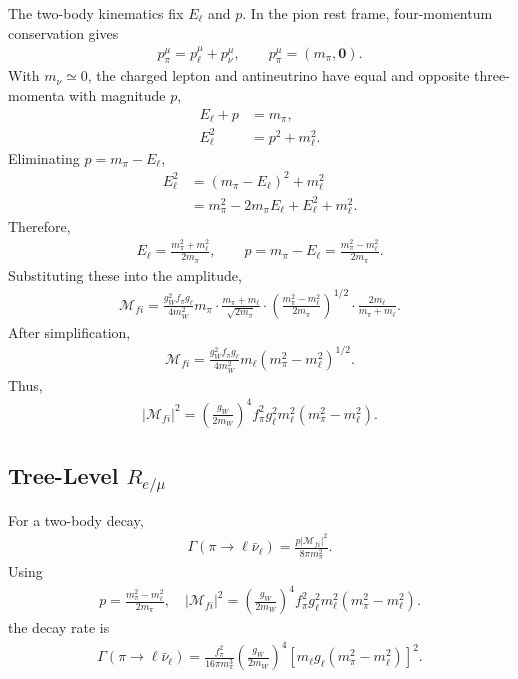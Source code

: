 The two-body kinematics fix \(E_\ell\) and \(p\). In the pion rest frame,
four-momentum conservation gives
\begin{align}
p_\pi^\mu
=
p_\ell^\mu+p_\nu^\mu,
\qquad
p_\pi^\mu = (m_\pi,\mathbf{0}).
\end{align}
With \(m_\nu \simeq 0\), the charged lepton and antineutrino have equal and
opposite three-momenta with magnitude \(p\),
\begin{align}
E_\ell + p &= m_\pi, \\
E_\ell^2 &= p^2 + m_\ell^2 .
\end{align}
Eliminating \(p=m_\pi-E_\ell\),
\begin{align}
E_\ell^2
&=
(m_\pi-E_\ell)^2+m_\ell^2 \\
&=
m_\pi^2-2m_\pi E_\ell+E_\ell^2+m_\ell^2 .
\end{align}
Therefore,
\begin{align}
E_\ell
=
\frac{m_\pi^2+m_\ell^2}{2m_\pi},
 \qquad
p
=
m_\pi-E_\ell
=
\frac{m_\pi^2-m_\ell^2}{2m_\pi}.
\end{align}
Substituting these into the amplitude,
\begin{align}
\mathcal{M}_{fi}
=
\frac{g_W^2 f_\pi g_\ell}{4m_W^2}
m_\pi
\cdot
\frac{m_\pi+m_\ell}{\sqrt{2m_\pi}}
\cdot
\left(
\frac{m_\pi^2-m_\ell^2}{2m_\pi}
\right)^{1/2}
\cdot
\frac{2m_\ell}{m_\pi+m_\ell}.
\end{align}
After simplification,
\begin{align}
\mathcal{M}_{fi}
=
\frac{g_W^2 f_\pi g_\ell}{4m_W^2}
m_\ell
\left(m_\pi^2-m_\ell^2\right)^{1/2}.
\end{align}
Thus,
\begin{align}
|\mathcal{M}_{fi}|^2
=
\left(
\frac{g_W}{2m_W}
\right)^4
f_\pi^2 g_\ell^2
m_\ell^2
\left(m_\pi^2-m_\ell^2\right).
\end{align}

\subsection{\texorpdfstring{Tree-Level $R_{e/\mu}$}{Tree-Level Re/mu}}
\label{subsec:tree-level-remu-appendix}

For a two-body decay,
\begin{align}
\Gamma(\pi \to \ell \bar{\nu}_\ell)
=
\frac{p|\mathcal{M}_{fi}|^2}{8\pi m_\pi^2}.
\end{align}
Using
\begin{align}
p
=
\frac{m_\pi^2-m_\ell^2}{2m_\pi},
\quad
|\mathcal{M}_{fi}|^2
=
\left(
\frac{g_W}{2m_W}
\right)^4
f_\pi^2 g_\ell^2
m_\ell^2
\left(m_\pi^2-m_\ell^2\right).
\end{align}
the decay rate is
\begin{align}
\Gamma(\pi \to \ell \bar{\nu}_\ell)
=
\frac{f_\pi^2}{16\pi m_\pi^3}
\left(
\frac{g_W}{2m_W}
\right)^4
\left[
m_\ell g_\ell
\left(m_\pi^2-m_\ell^2\right)
\right]^2 .
\end{align}

